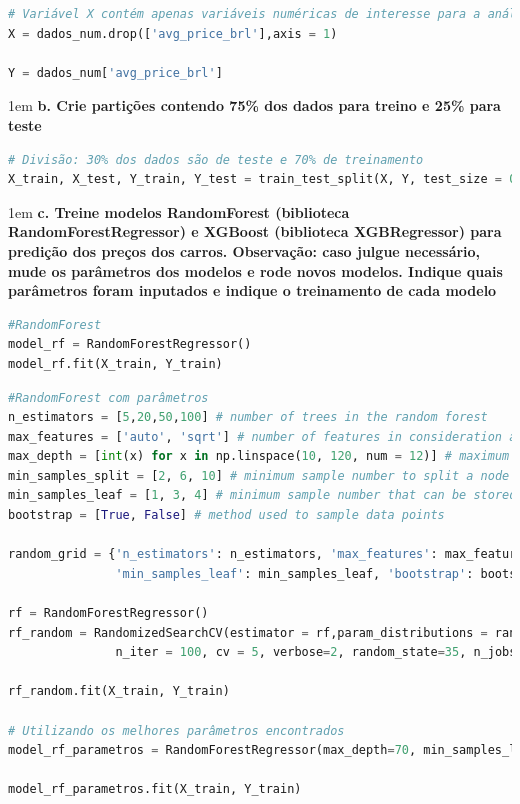 \begin{lstlisting}[language=Python, style=input]
# Variável X contém apenas variáveis numéricas de interesse para a análise, excluindo a variável target 
X = dados_num.drop(['avg_price_brl'],axis = 1)

Y = dados_num['avg_price_brl']
\end{lstlisting}


\begin{adjustwidth}{1em}{}
\textbf{b. Crie partições contendo 75\% dos dados para treino e 25\% para teste}
\end{adjustwidth}
\begin{lstlisting}[language=Python, style=input]
# Divisão: 30% dos dados são de teste e 70% de treinamento
X_train, X_test, Y_train, Y_test = train_test_split(X, Y, test_size = 0.25, random_state = 42)
\end{lstlisting}

\begin{adjustwidth}{1em}{}
\textbf{c. Treine modelos RandomForest (biblioteca RandomForestRegressor) e XGBoost (biblioteca XGBRegressor) para predição
dos preços dos carros. \textbf{Observação}: caso julgue necessário, mude os parâmetros dos modelos e rode novos
modelos. Indique quais parâmetros foram inputados e indique o treinamento de cada modelo}
\end{adjustwidth}
\begin{lstlisting}[language=Python, style=input]
#RandomForest
model_rf = RandomForestRegressor()
model_rf.fit(X_train, Y_train)
\end{lstlisting}

\begin{lstlisting}[language=Python, style=input]
#RandomForest com parâmetros
n_estimators = [5,20,50,100] # number of trees in the random forest
max_features = ['auto', 'sqrt'] # number of features in consideration at every split
max_depth = [int(x) for x in np.linspace(10, 120, num = 12)] # maximum number of levels allowed in each decision tree
min_samples_split = [2, 6, 10] # minimum sample number to split a node
min_samples_leaf = [1, 3, 4] # minimum sample number that can be stored in a leaf node
bootstrap = [True, False] # method used to sample data points

random_grid = {'n_estimators': n_estimators, 'max_features': max_features, 'max_depth': max_depth, 'min_samples_split': min_samples_split, 
               'min_samples_leaf': min_samples_leaf, 'bootstrap': bootstrap}

rf = RandomForestRegressor()
rf_random = RandomizedSearchCV(estimator = rf,param_distributions = random_grid,
               n_iter = 100, cv = 5, verbose=2, random_state=35, n_jobs = -1)

rf_random.fit(X_train, Y_train)

# Utilizando os melhores parâmetros encontrados
model_rf_parametros = RandomForestRegressor(max_depth=70, min_samples_leaf=1, min_samples_split=2, n_estimators=20, random_state=80)

model_rf_parametros.fit(X_train, Y_train)
\end{lstlisting}

